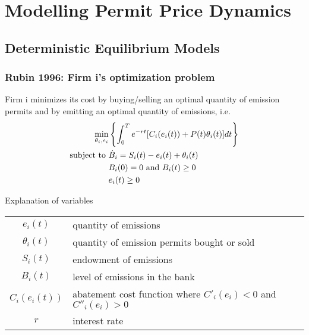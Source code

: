 \section{Modelling Permit Price Dynamics}
\subsection{Deterministic Equilibrium Models}
\begin{frame}
\frametitle{Rubin 1996: Firm i's optimization problem}
Firm i minimizes its cost by buying/selling an optimal quantity of emission permits and by emitting an optimal quantity of emissions, i.e.
\begin{align}
\min_{\theta_i, e_i} & \left\{ \int_0^T e^{-rt} [C_i(e_i(t)) + P(t)\theta_i(t)]dt \right\} \\
\textnormal{subject to }
&\dot{B}_i = S_i(t) - e_i(t) + \theta_i(t) \\
&            B_i(0) = 0 \textnormal{ and } B_i(t) \ge 0 \\
&            e_i(t) \ge 0
\end{align}


{Explanation of variables}
\begin{tiny}
\begin{tabular}{cl}
$e_i(t)$ & quantity of emissions \\
$\theta_i(t)$ & quantity of emission permits bought or sold \\
$S_i(t)$ & endowment of emissions \\
$B_i(t)$ & level of emissions in the bank\\
$C_i(e_i(t))$ & abatement cost function where $C'_i(e_i) < 0$ and $C''_i(e_i) > 0$ \\
$r$ & interest rate \\
\end{tabular}
\end{tiny}
\end{frame}

